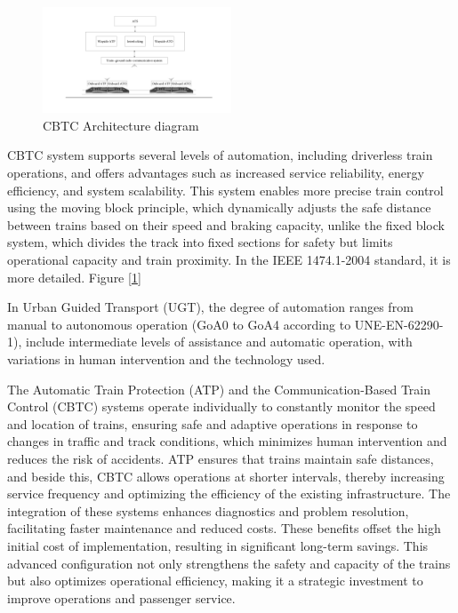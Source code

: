 \documentclass[conference]{IEEEtran}
\begin{document}
\begin{figure}[ht]
    \centering
    \centerline{\includegraphics[width=0.5\textwidth, scale=0.90]{Imagenes_general/esquema_general_arquitectura_CBTC_1.pdf}}
    \caption{CBTC Architecture diagram}
    \label{CBTC Architecture diagram}
\end{figure}

CBTC system supports several levels of automation, including driverless train operations, and offers advantages such as increased service reliability, energy efficiency, and system scalability. This system enables more precise train control using the moving block principle, which dynamically adjusts the safe distance between trains based on their speed and braking capacity, unlike the fixed block system, which divides the track into fixed sections for safety but limits operational capacity and train proximity. In the IEEE 1474.1-2004 standard, it is more detailed. Figure [\ref{CBTC Architecture diagram}]

In Urban Guided Transport (UGT), the degree of automation ranges from manual to autonomous operation (GoA0 to GoA4 according to UNE-EN-62290-1), include intermediate levels of assistance and automatic operation, with variations in human intervention and the technology used.

The Automatic Train Protection (ATP) and the Communication-Based Train Control (CBTC) systems operate individually to constantly monitor the speed and location of trains, ensuring safe and adaptive operations in response to changes in traffic and track conditions, which minimizes human intervention and reduces the risk of accidents. ATP ensures that trains maintain safe distances, and beside this, CBTC allows operations at shorter intervals, thereby increasing service frequency and optimizing the efficiency of the existing infrastructure. The integration of these systems enhances diagnostics and problem resolution, facilitating faster maintenance and reduced costs. These benefits offset the high initial cost of implementation, resulting in significant long-term savings. This advanced configuration not only strengthens the safety and capacity of the trains but also optimizes operational efficiency, making it a strategic investment to improve operations and passenger service.
\end{document}
